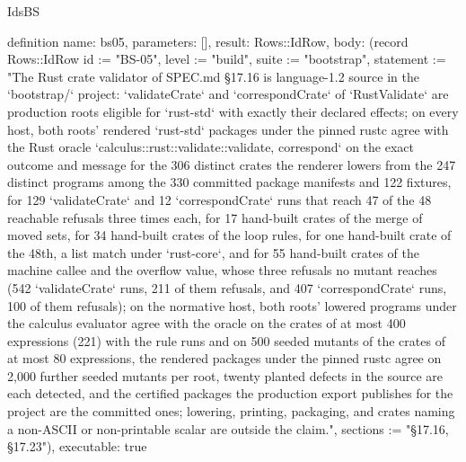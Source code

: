 \begin{lexlean}{IdsBS}
\begin{semanticmodule}
definition{
  name: bs05,
  parameters: [],
  result: Rows::IdRow,
  body: (record Rows::IdRow {id := "BS-05", level := "build", suite := "bootstrap", statement := "The Rust crate validator of SPEC.md §17.16 is language-1.2 source in the `bootstrap/` project: `validateCrate` and `correspondCrate` of `RustValidate` are production roots eligible for `rust-std` with exactly their declared effects; on every host, both roots' rendered `rust-std` packages under the pinned rustc agree with the Rust oracle `calculus::rust::validate::{validate, correspond}` on the exact outcome and message for the 306 distinct crates the renderer lowers from the 247 distinct programs among the 330 committed package manifests and 122 fixtures, for 129 `validateCrate` and 12 `correspondCrate` runs that reach 47 of the 48 reachable refusals three times each, for 17 hand-built crates of the merge of moved sets, for 34 hand-built crates of the loop rules, for one hand-built crate of the 48th, a list match under `rust-core`, and for 55 hand-built crates of the machine callee and the overflow value, whose three refusals no mutant reaches (542 `validateCrate` runs, 211 of them refusals, and 407 `correspondCrate` runs, 100 of them refusals); on the normative host, both roots' lowered programs under the calculus evaluator agree with the oracle on the crates of at most 400 expressions (221) with the rule runs and on 500 seeded mutants of the crates of at most 80 expressions, the rendered packages under the pinned rustc agree on 2,000 further seeded mutants per root, twenty planted defects in the source are each detected, and the certified packages the production export publishes for the project are the committed ones; lowering, printing, packaging, and crates naming a non-ASCII or non-printable scalar are outside the claim.", sections := "§17.16, §17.23"}),
  executable: true
}


\end{semanticmodule}
\end{lexlean}
